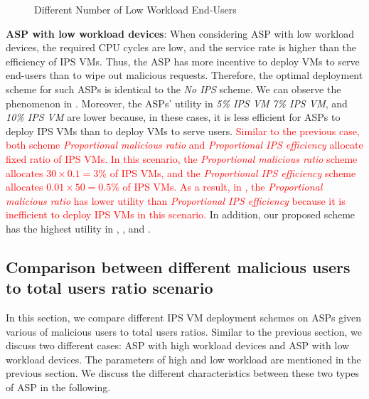 \documentclass[10pt,journal, compsoc]{IEEEtran}
\begin{document}
\begin{figure}[!]
\captionsetup{justification=centering}
  \hfill
  \hfill
\label{fig:num_cmp_low}
\caption{Different Number of Low Workload End-Users}
\end{figure}

\textbf{ASP with low workload devices}:
When considering ASP with low workload devices, the required CPU cycles are low, and the service rate is higher than the efficiency of IPS VMs. Thus, the ASP has more incentive to deploy VMs to serve end-users than to wipe out malicious requests. Therefore, the optimal deployment scheme for such ASPs is identical to the \textit{No IPS} scheme. We can observe the phenomenon in . Moreover, the ASPs' utility in \textit{5\% IPS VM} \textit{7\% IPS VM}, and \textit{10\% IPS VM} are lower because, in these cases, it is less efficient for ASPs to deploy IPS VMs than to deploy VMs to serve users. \textcolor{red}{Similar to the previous case, both scheme \textit{Proportional malicious ratio} and \textit{Proportional IPS efficiency} allocate fixed ratio of IPS VMs. In this scenario, the \textit{Proportional malicious ratio} scheme allocates $30 \times 0.1 = 3\%$ of IPS VMs, and the \textit{Proportional IPS efficiency} scheme allocates $0.01 \times 50 = 0.5\%$ of IPS VMs. As a result, in , the \textit{Proportional malicious ratio} has lower utility than \textit{Proportional IPS efficiency} because it is inefficient to deploy IPS VMs in this scenario.} In addition, our proposed scheme has the highest utility in , , and .

\subsection{Comparison between different malicious users to total users ratio scenario}\label{subsec:mal}
In this section, we compare different IPS VM deployment schemes on ASPs given various of malicious users to total users ratios. Similar to the previous section, we discuss two different cases: ASP with high workload devices and ASP with low workload devices. The parameters of high and low workload are mentioned in the previous section. We discuss the different characteristics between these two types of ASP in the following. 
\end{document}
